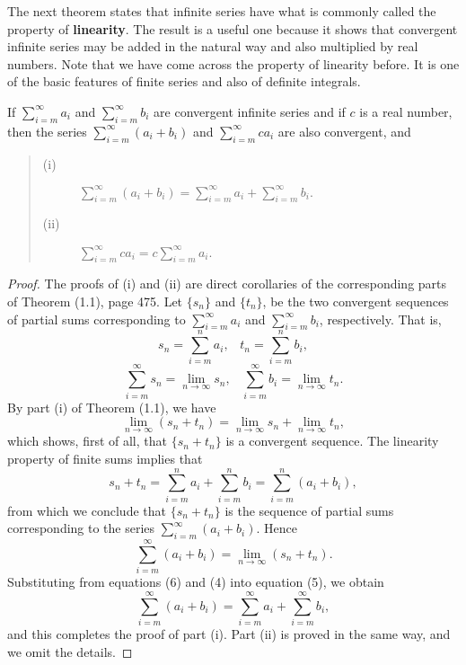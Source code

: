 The next theorem states that infinite series have what is commonly called the property of \textbf{linearity}. The result is a useful one because it shows that convergent infinite series may be added in the natural way and also multiplied by real numbers. Note that we have come across the property of linearity before. It is one of the basic features of finite series and also of definite integrals.

\begin{theorem} %
If $\sum_{i=m}^ \infty a_i$ and $\sum_{i=m}^ \infty  b_i$ are convergent infinite series and if $c$ is a real number, then the series $\sum_{i=m}^ \infty (a_i + b_i)$ and $\sum_{i=m}^ \infty ca_i$ are also convergent, and

\begin{quote}
\begin{description}
\item[(i)] $\sum_{i=m}^\infty (a_i + b_i) = \sum_{i=m}^\infty a_i + \sum_{i=m}^\infty b_i .$
\item[(ii)] $\sum_{i=m}^\infty ca_i = c \sum_{i=m}^\infty a_i.$

\end{description}
\end{quote}
\end{theorem}

\begin{proof}
The proofs of (i) and (ii) are direct corollaries of the corresponding parts of Theorem (1.1), page 475. Let $\{ s_n \}$ and $\{ t_n \}$, be the two convergent sequences of partial sums corresponding to $\sum_{i=m}^\infty a_i$ and $\sum_{i=m}^\infty b_i$, respectively. That is,
$$
s_n = \sum_{i=m}^n a_i, \;\;\; t_n = \sum_{i=m}^n b_i,
$$
\begin{equation}
\sum_{i=m}^\infty s_n = \lim_{n \rightarrow \infty} s_n, \;\;\;
\sum_{i=m}^\infty b_i = \lim_{n \rightarrow \infty} t_n.   
\label{eq9.2.4}
\end{equation}
By part (i) of Theorem (1.1), we have
\begin{equation}
\lim_{n \rightarrow \infty} (s_n + t_n) = \lim_{n \rightarrow \infty} s_n + \lim_{n \rightarrow \infty} t_n, 
\label{eq9.2.5}
\end{equation}
which shows, first of all, that $\{ s_n + t_n \}$ is a convergent sequence. The linearity property of finite sums implies that
$$
s_n + t_n = \sum_{i=m}^n a_i + \sum_{i=m}^n b_i = \sum_{i=m}^n (a_i + b_i),
$$
from which we conclude that $\{ s_n + t_n \}$ is the sequence of partial sums corresponding to the series $\sum_{i=m}^\infty (a_i + b_i)$. Hence
\begin{equation}
\sum_{i=m}^\infty (a_i + b_i) = \lim_{n \rightarrow \infty} (s_n + t_n). 
\label{eq9.2.6}
\end{equation}
Substituting from equations (6) and (4) into equation (5), we obtain 
$$
\sum_{i=m}^\infty (a_i + b_i) = \sum_{i=m}^\infty a_i + \sum_{i=m}^\infty b_i,
$$
and this completes the proof of part (i). Part (ii) is proved in the same way, and we omit the details.
\end{proof}

